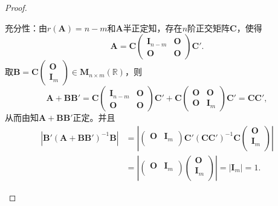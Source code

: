 \documentclass[../../main.tex]{subfiles}%
\begin{document}
\begin{proof}
\begin{enumerate}[(1)]
{\heiti 充分性：}由$r\left( \boldsymbol{A} \right) =n-m$和$\boldsymbol{A}$半正定知，存在$n$阶正交矩阵$\boldsymbol{C}$，使得
$$\boldsymbol{A}=\boldsymbol{C}\begin{pmatrix} \boldsymbol{I}_{n-m}&\boldsymbol{O}\\ \boldsymbol{O}&\boldsymbol{O} \end{pmatrix}\boldsymbol{C}'.$$
取$\boldsymbol{B}=\boldsymbol{C}\begin{pmatrix} \boldsymbol{O}\\ \boldsymbol{I}_m \end{pmatrix} \in \boldsymbol{M}_{n\times m}\left( \mathbb{R} \right)$，则
$$\boldsymbol{A}+\boldsymbol{BB}'=\boldsymbol{C}\begin{pmatrix} \boldsymbol{I}_{n-m}&\boldsymbol{O}\\ \boldsymbol{O}&\boldsymbol{O} \end{pmatrix}\boldsymbol{C}'+\boldsymbol{C}\begin{pmatrix} \boldsymbol{O}&\boldsymbol{O}\\ \boldsymbol{O}&\boldsymbol{I}_m \end{pmatrix}\boldsymbol{C}'=\boldsymbol{CC}',$$
从而由知$\boldsymbol{A}+\boldsymbol{BB}'$正定。并且
\begin{align*}
\left| \boldsymbol{B}' \left( \boldsymbol{A}+\boldsymbol{BB}' \right) ^{-1}\boldsymbol{B} \right|&=\left| \left( \begin{matrix}
\boldsymbol{O}&		\boldsymbol{I}_m\\
\end{matrix} \right) \boldsymbol{C}' \left( \boldsymbol{CC}' \right) ^{-1}\boldsymbol{C}\left( \begin{array}{c}
\boldsymbol{O}\\
\boldsymbol{I}_m\\
\end{array} \right) \right|
\\
&=\left| \left( \begin{matrix}
\boldsymbol{O}&		\boldsymbol{I}_m\\
\end{matrix} \right) \left( \begin{array}{c}
\boldsymbol{O}\\
\boldsymbol{I}_m\\
\end{array} \right) \right|=\left| \boldsymbol{I}_m \right|=1.
\end{align*}
\end{enumerate}
\end{proof}
\end{document}
